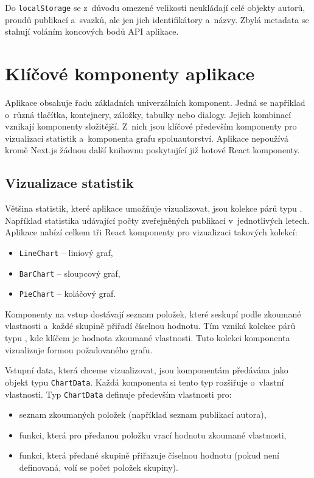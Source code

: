 \documentclass[
  biblatex,
  sourcecodes,
  glossaries,
  index
]{kidiplom}
\begin{document}
Do \texttt{localStorage} se z~důvodu omezené velikosti neukládají celé objekty autorů, proudů publikací a~svazků, ale jen jich identifikátory a~názvy. Zbylá metadata se stahují voláním koncových bodů API aplikace.

\newpage

\section{Klíčové komponenty aplikace}

Aplikace obsahuje řadu základních univerzálních komponent. Jedná se například o~různá tlačítka, kontejnery, záložky, tabulky nebo dialogy. Jejich kombinací vznikají komponenty složitější. Z~nich jsou klíčové především komponenty pro vizualizaci statistik a~komponenta grafu spoluautorství. Aplikace nepoužívá kromě Next.js žádnou další knihovnu poskytující již hotové React komponenty.

\subsection{Vizualizace statistik}

Většina statistik, které aplikace umožňuje vizualizovat, jsou kolekce párů typu . Například statistika udávající počty zveřejněných publikací v~jednotlivých letech. Aplikace nabízí celkem tři React komponenty pro vizualizaci takových kolekcí:
\begin{itemize}
\item \texttt{LineChart} -- liniový graf,
\item \texttt{BarChart} -- sloupcový graf,
\item \texttt{PieChart} -- koláčový graf.
\end{itemize}

Komponenty na vstup dostávají seznam položek, které seskupí podle zkoumané vlastnosti a~každé skupině přiřadí číselnou hodnotu. Tím vzniká kolekce párů typu , kde klíčem je hodnota zkoumané vlastnosti. Tuto kolekci komponenta vizualizuje formou požadovaného grafu.

Vstupní data, která chceme vizualizovat, jsou komponentám předávána jako objekt typu \texttt{ChartData}. Každá komponenta si tento typ rozšiřuje o~vlastní vlastnosti. Typ \texttt{ChartData} definuje především vlastnosti pro:
\begin{itemize}
\item seznam zkoumaných položek (například seznam publikací autora),
\item funkci, která pro předanou položku vrací hodnotu zkoumané vlastnosti,
\item funkci, která předané skupině přiřazuje číselnou hodnotu (pokud není definovaná, volí se počet položek skupiny).
\end{itemize}
\end{document}
